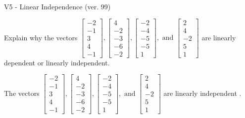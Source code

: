 \begin{exercise}
  \begin{exerciseTitle}V5 - Linear Independence (ver. 99)\end{exerciseTitle}
  \begin{exerciseStatement}
    Explain why the vectors \(\left[\begin{array}{r}
-2 \\
-1 \\
3 \\
4 \\
-1
\end{array}\right] , \left[\begin{array}{r}
4 \\
-2 \\
-3 \\
-6 \\
-2
\end{array}\right] , \left[\begin{array}{r}
-2 \\
-4 \\
-5 \\
-5 \\
1
\end{array}\right] , \text{ and } \left[\begin{array}{r}
2 \\
4 \\
-2 \\
5 \\
1
\end{array}\right]\) are linearly dependent or linearly independent.	


  \end{exerciseStatement}
  \begin{exerciseAnswer}
   The vectors \(\left[\begin{array}{r}
-2 \\
-1 \\
3 \\
4 \\
-1
\end{array}\right] , \left[\begin{array}{r}
4 \\
-2 \\
-3 \\
-6 \\
-2
\end{array}\right] , \left[\begin{array}{r}
-2 \\
-4 \\
-5 \\
-5 \\
1
\end{array}\right] , \text{ and } \left[\begin{array}{r}
2 \\
4 \\
-2 \\
5 \\
1
\end{array}\right]\) are 
  	 linearly independent  .
  


  \end{exerciseAnswer}
\end{exercise}